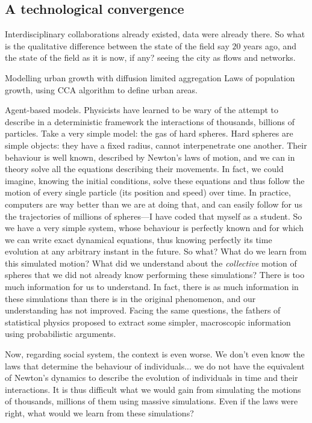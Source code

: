     \subsection{A technological convergence}
    \label{sub:a_technological_convergence} 



Interdisciplinary collaborations already existed, data were already there. So
what is the qualitative difference between the state of the field say $20$ years
ago, and the state of the field as it is now, if any?\cite{Batty:2008,Batty:2012,Batty:2013} seeing the city as flows and networks.

\cite{Makse:1995} Modelling urban growth with diffusion limited aggregation
\cite{Rozenfeld:2008} Laws of population growth, using CCA algorithm to define
urban areas.


Agent-based models. Physicists have learned to be wary of the attempt to
describe in a deterministic framework the interactions of thousands, billions of
particles. Take a very simple model: the gas of hard spheres. Hard spheres are
simple objects: they have a fixed radius, cannot interpenetrate one another.
Their behaviour is well known, described by Newton's laws of motion, and we can
in theory solve all the equations describing their movements. In fact, we could
imagine, knowing the initial conditions, solve these equations and thus follow
the motion of every single particle (its position and speed) over time. In
practice, computers are way better than we are at doing that, and can easily follow for
us the trajectories of millions of spheres---I have coded that myself as a
student. So we have a very simple system, whose behaviour is perfectly known and
for which we can write exact dynamical equations, thus knowing perfectly its
time evolution at any arbitrary instant in the future. So what? What do we learn
from this simulated motion? What did we understand about the \emph{collective}
motion of spheres that we did not already know performing these simulations?
There is too much information for us to understand. In fact, there is as much
information in these simulations than there is in the original phenomenon, and
our understanding has not improved.
Facing the same questions, the fathers of statistical physics proposed to
extract some simpler, macroscopic information using probabilistic arguments.

Now, regarding social system, the context is even worse. We don't even know the
laws that determine the behaviour of individuals... we do not have the
equivalent of Newton's dynamics to describe the evolution of individuals in time
and their interactions. It is thus difficult what we would gain from simulating
the motions of thousands, millions of them using massive simulations. Even if
the laws were right, what would we learn from these simulations?


